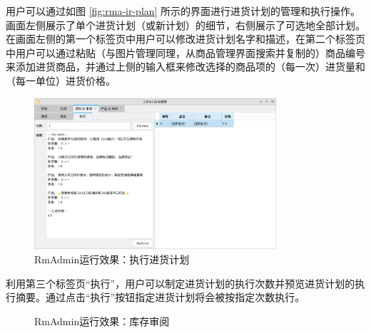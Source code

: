 用户可以通过如图 \ref{fig:rma-ir-plan} 所示的界面进行进货计划的管理和执行操作。画面左侧展示了单个进货计划（或新计划）的细节，右侧展示了可选地全部计划。在画面左侧的第一个标签页中用户可以修改进货计划名字和描述，在第二个标签页中用户可以通过粘贴（与图片管理同理，从商品管理界面搜索并复制的）商品编号来添加进货商品，并通过上侧的输入框来修改选择的商品项的（每一次）进货量和（每一单位）进货价格。

\begin{figure}[htbp]
	\centering
	\includegraphics[width=0.8\textwidth]{./exp/rma-ir-exec-1.png}
	\caption{RmAdmin运行效果：执行进货计划}
	\label{fig:rma-ir-exec-1}
\end{figure}

利用第三个标签页“执行”，用户可以制定进货计划的执行次数并预览进货计划的执行摘要。通过点击“执行”按钮指定进货计划将会被按指定次数执行。

\begin{figure}[htbp]
    \hfill
	\caption{RmAdmin运行效果：库存审阅}
	\label{fig:rma-audit}
\end{figure}

